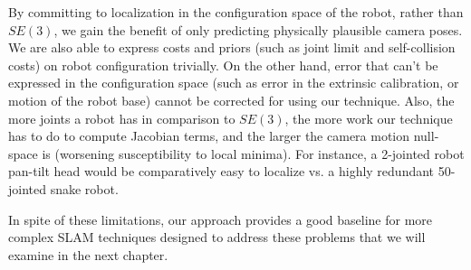 By committing to localization in the configuration space of the robot, rather than $SE(3)$, we gain the benefit of only predicting physically plausible camera poses. We are also able to express costs and priors (such as joint limit and self-collision costs) on robot configuration trivially. On the other hand, error that can't be expressed in the configuration space (such as error in the extrinsic calibration, or motion of the robot base) cannot be corrected for using our technique. Also, the more joints a robot has in comparison to $SE(3)$, the more work our technique has to do to compute Jacobian terms, and the larger the camera motion null-space is (worsening susceptibility to local minima). For instance, a 2-jointed robot pan-tilt head would be comparatively easy to localize vs. a highly redundant 50-jointed snake robot. 

In spite of these limitations, our approach provides a good baseline for more complex SLAM techniques designed to address these problems that we will examine in the next chapter.